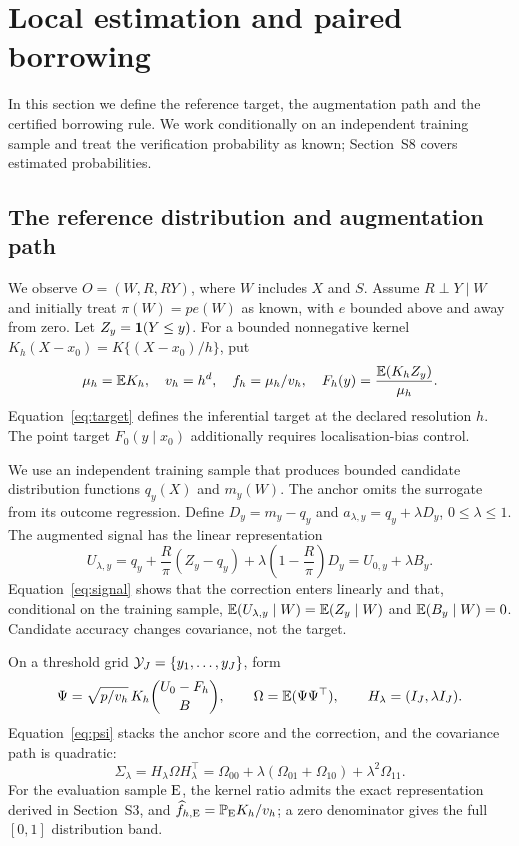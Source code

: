 \section{Local estimation and paired borrowing}
In this section we define the reference target, the augmentation path and the certified borrowing rule. We work conditionally on an independent training sample and treat the verification probability as known; Section~S8 covers estimated probabilities.

\subsection{The reference distribution and augmentation path}
We observe $O=(W,R,RY)$, where $W$ includes $X$ and $S$. Assume $R\perp Y\mid W$ and initially treat $\pi(W)=p e(W)$ as known, with $e$ bounded above and away from zero. Let $Z_y=\mathbf 1(Y\leq y)$. For a bounded nonnegative kernel $K_h(X-x_0)=K\{(X-x_0)/h\}$, put
\begin{equation}\label{eq:target}
 \mu_h=\mathbb E K_h,\quad v_h=h^d,\quad f_h=\mu_h/v_h,\quad
 F_h(y)=\frac{\mathbb E(K_hZ_y)}{\mu_h}.
\end{equation}
Equation~\eqref{eq:target} defines the inferential target at the declared resolution $h$. The point target $F_0(y\mid x_0)$ additionally requires localisation-bias control.

We use an independent training sample that produces bounded candidate distribution functions $q_y(X)$ and $m_y(W)$. The anchor omits the surrogate from its outcome regression. Define $D_y=m_y-q_y$ and $a_{\lambda,y}=q_y+\lambda D_y$, $0\leq\lambda\leq1$. The augmented signal has the linear representation
\begin{equation}\label{eq:signal}
 U_{\lambda,y}=q_y+\frac R\pi(Z_y-q_y)
       +\lambda\left(1-\frac R\pi\right)D_y
       =U_{0,y}+\lambda B_y.
\end{equation}
Equation~\eqref{eq:signal} shows that the correction enters linearly and that, conditional on the training sample, $\mathbb E(U_{\lambda,y}\mid W)=\mathbb E(Z_y\mid W)$ and $\mathbb E(B_y\mid W)=0$. Candidate accuracy changes covariance, not the target.

On a threshold grid $\mathcal Y_J=\{y_1,\ldots,y_J\}$, form
\begin{equation}\label{eq:psi}
 \Psi=\sqrt{p/v_h}\,K_h
       \binom{U_0-F_h}{B},\qquad
 \Omega=\mathbb E(\Psi\Psi^\top),\qquad H_\lambda=(I_J,\lambda I_J).
\end{equation}
Equation~\eqref{eq:psi} stacks the anchor score and the correction, and the covariance path is quadratic:
\begin{equation}\label{eq:path}
 \Sigma_\lambda=H_\lambda\Omega H_\lambda^\top
 =\Omega_{00}+\lambda(\Omega_{01}+\Omega_{10})+\lambda^2\Omega_{11}.
\end{equation}
For the evaluation sample $\mathrm{E}$, the kernel ratio admits the exact representation derived in Section~S3, and $\widehat f_{h,\mathrm{E}}=\mathbb P_{\mathrm{E}}K_h/v_h$; a zero denominator gives the full $[0,1]$ distribution band.

